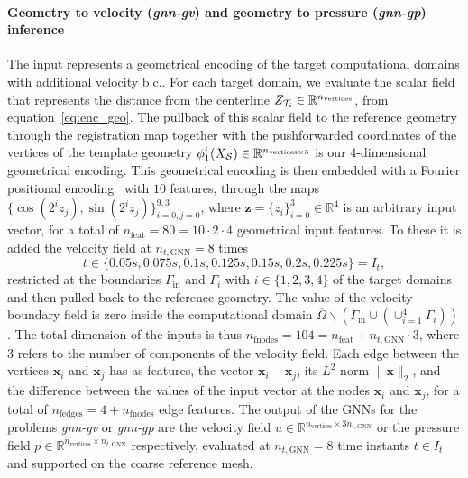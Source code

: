\paragraph*{Geometry to velocity (\textit{gnn-gv}) and geometry to pressure (\textit{gnn-gp}) inference}
The input represents a geometrical encoding of the target computational domains with additional velocity b.c.. For each target domain, we evaluate the scalar field that represents the distance from the centerline $Z_{\mathcal T_{i}}\in\mathbb{R}^{n_{\text{vertices}}}$, from equation~\eqref{eq:enc_geo}. The pullback of this scalar field to the reference geometry through the registration map together with the pushforwarded coordinates of the vertices of the template geometry $\phi^i_1(X_{\mathcal S})\in\mathbb{R}^{n_{\text{vertices}\times 3}}$ is our $4$-dimensional geometrical encoding. This geometrical encoding is then embedded with a Fourier positional encoding~\cite{sutherland2015error} with $10$ features, through the maps $\{\cos(2^{i}z_j), \sin(2^{i}z_j)\}_{i=0, j=0}^{9, 3}$, where $\mathbf{z}=\{z_i\}_{i=0}^3\in\mathbb{R}^4$ is an arbitrary input vector, for a total of $n_{\text{feat}}=80=10\cdot 2\cdot 4$ geometrical input features. To these it is added the velocity field at $n_{t,\text{GNN}}=8$ times
\begin{equation}\label{eq:int}
  t\in\{0.05s, 0.075s, 0.1s, 0.125s, 0.15s, 0.2s, 0.225s\}=I_t,
\end{equation}
restricted at the boundaries $\Gamma_{\text{in}}$ and $\Gamma_i$ with $i\in\{1, 2, 3, 4\}$ of the target domains and then pulled back to the reference geometry. The value of the velocity boundary field is zero inside the computational domain $\overline{\Omega}\backslash \left(\Gamma_{\text{in}}\cup \left(\cup_{i=1}^{4}\Gamma_i\right)\right)$. The total dimension of the inputs is thus $n_{\text{fnodes}} = 104 =n_{\text{feat}}+n_{t,\text{GNN}}\cdot 3$, where $3$ refers to the number of components of the velocity field. Each edge between the vertices $\mathbf{x}_i$ and $\mathbf{x}_j$ has as features, the vector $\mathbf{x}_i-\mathbf{x}_j$, its $L^2$-norm $\lVert\mathbf{x}\rVert_2$, and the difference between the values of the input vector at the nodes $\mathbf{x}_i$ and $\mathbf{x}_j$, for a total of $n_{\text{fedges}}=4+n_{\text{fnodes}}$ edge features. The output of the GNNs for the problems \textit{gnn-gv} or \textit{gnn-gp} are the velocity field $u\in\mathbb{R}^{n_{\text{vertices}}\times 3n_{t,\text{GNN}}}$ or the pressure field $p\in\mathbb{R}^{n_{\text{vertices}}\times n_{t,\text{GNN}}}$ respectively, evaluated at $n_{t,\text{GNN}}=8$ time instants $t\in I_t$ and supported on the coarse reference mesh.

